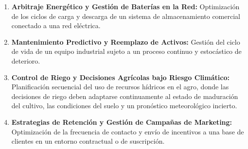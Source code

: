 \documentclass[11pt]{article}
\begin{document}
\begin{enumerate}
    \item \textbf{Arbitraje Energético y Gestión de Baterías en la Red:}
    Optimización de los ciclos de carga y descarga de un sistema de almacenamiento comercial conectado a una red eléctrica. 

    \item \textbf{Mantenimiento Predictivo y Reemplazo de Activos:}
    Gestión del ciclo de vida de un equipo industrial sujeto a un proceso continuo y estocástico de deterioro.

    \item \textbf{Control de Riego y Decisiones Agrícolas bajo Riesgo Climático:}
    Planificación secuencial del uso de recursos hídricos en el agro, donde las decisiones de riego deben adaptarse continuamente al estado de maduración del cultivo, las condiciones del suelo y un pronóstico meteorológico incierto.

    \item \textbf{Estrategias de Retención y Gestión de Campañas de Marketing:}
    Optimización de la frecuencia de contacto y envío de incentivos a una base de clientes en un entorno contractual o de suscripción. 
\end{enumerate}
\end{document}
